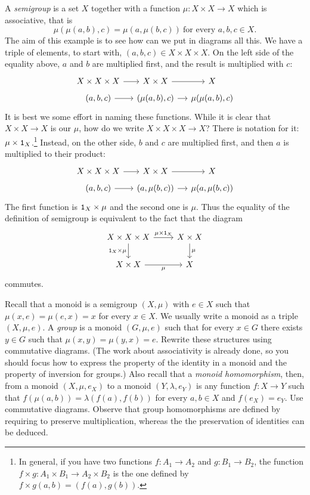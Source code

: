 \begin{example}
A {\em semigroup} is a set \(X\) together with a function \(\mu : X \times X \to X\) which is associative, that is
\[\mu(\mu(a, b), c) = \mu(a, \mu(b, c)) \ \text{for every } a, b, c \in X .\] The aim of this example is to see how can we put in diagrams all this. We have a triple of elements, to start with, \((a, b, c) \in X \times X \times X\). On the left side of the equality above, \(a\) and \(b\) are multiplied first, and the result is multiplied with \(c\):
\[\begin{tikzcd}[row sep=tiny, column sep=small]
X \times X \times X \ar[r] & X \times X \ar[r] & X \\
(a, b, c) \ar[r] & (\mu(a, b), c) \ar[r] & \mu(\mu(a, b), c)
\end{tikzcd}\]
It is best we some effort in naming these functions. While it is clear that \(X \times X \to X\) is our \(\mu\), how do we write \(X \times X \times X \to X\)? There is notation for it: \(\mu \times \mathtt 1_X\).\footnote{In general, if you have two functions \(f : A_1 \to A_2\) and \(g : B_1 \to B_2\), the function \(f \times g : A_1 \times B_1 \to A_2 \times B_2\) is the one defined by \(f \times g (a, b) = (f(a), g(b))\).} Instead, on the other side, \(b\) and \(c\) are multiplied first, and then \(a\) is multiplied to their product:
\[\begin{tikzcd}[row sep=tiny, column sep=small]
X \times X \times X \ar[r] & X \times X \ar[r] & X \\
(a, b, c) \ar[r] & (a, \mu(b, c)) \ar[r] & \mu(a, \mu(b, c))
\end{tikzcd}\]
The first function is \(\mathtt 1_X \times \mu\) and the second one is \(\mu\). Thus the equality of the definition of semigroup is equivalent to the fact that the diagram
\[\begin{tikzcd}
X \times X \times X \ar["{\mu \times \id_X}", r] \ar["{\id_X \times \mu}", d, swap] & X \times X \ar["\mu", d] \\
X \times X \ar["\mu", r, swap] & X
\end{tikzcd}\]
commutes.
\end{example}

\begin{exercise}
Recall that a monoid is a semigroup \((X, \mu)\) with \(e \in X\) such that \(\mu(x, e) = \mu(e, x) = x\) for every \(x \in X\). We usually write a monoid as a triple \((X, \mu, e)\). A {\em group} is a monoid \((G, \mu, e)\) such that for every \(x \in G\) there exists \(y \in G\) such that \(\mu(x, y) = \mu(y, x) = e\). Rewrite these structures using commutative diagrams. (The work about associativity is already done, so you should focus how to express the property of the identity in a monoid and the property of inversion for groups.) Also recall that a {\em monoid homomorphism}, then, from a monoid \((X, \mu, e_X)\) to a monoid \((Y, \lambda, e_Y)\) is any function \(f : X \to Y\) such that \(f(\mu(a, b)) = \lambda (f(a), f(b))\) for every \(a, b \in X\) and \(f(e_X) = e_Y\). Use commutative diagrams. Observe that group homomorphisms are defined by requiring to preserve multiplication, whereas the the preservation of identities can be deduced. 
\end{exercise}

